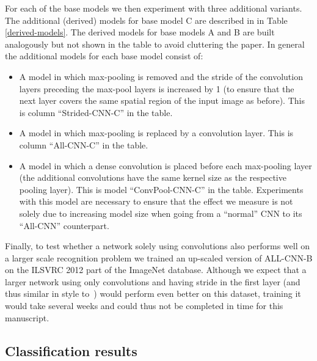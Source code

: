 \documentclass{article} \usepackage{iclr2015,times}
\begin{document}
For each of the base models we then experiment with three additional variants. The additional (derived) models for base model C are described in in Table \ref{derived-models}. The derived models for base models A and B are built analogously but not shown in the table to avoid cluttering the paper. 
In general the additional models for each base model consist of:
\begin{itemize}
  \item A model in which max-pooling is removed and the stride of the convolution layers
preceding the max-pool layers is increased by 1 (to ensure that the
next layer covers the same spatial region of the input image as
before). This is column ``Strided-CNN-C'' in the table.  
  \item A model in which max-pooling is replaced by a convolution
    layer. This is column ``All-CNN-C'' in the table.
  \item A model in which a dense convolution is placed before each
    max-pooling layer (the additional convolutions have the same kernel size as
    the respective pooling layer). This is model ``ConvPool-CNN-C'' in
    the table. Experiments with this model are necessary to ensure
    that the effect we measure is not solely due to increasing model
    size when going from a ``normal'' CNN to its ``All-CNN'' counterpart.
\end{itemize}

Finally, to test whether a network solely using convolutions also
performs well on a larger scale recognition problem we trained an
up-scaled version of ALL-CNN-B on the ILSVRC 2012 part of the ImageNet
database. Although we
expect that a larger network using only  convolutions and having stride  in the first layer (and 
thus similar in style to~\citet{VGG_2014}) would perform even
better on this dataset, training it would take several weeks 
and could thus not be completed in time for this manuscript.

\subsection{Classification results}
\end{document}
